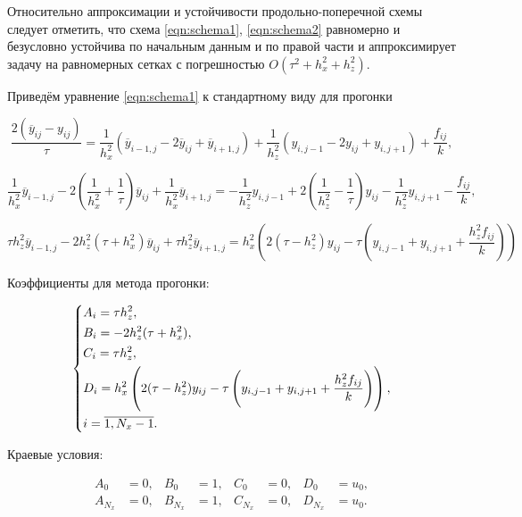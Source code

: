 \documentclass[12pt, a4paper]{article}
\begin{document}
Относительно аппроксимации и устойчивости продольно-поперечной схемы следует отметить, что схема \eqref{eqn:schema1}, \eqref{eqn:schema2} равномерно и безусловно устойчива по начальным данным и по правой части и аппроксимирует задачу на равномерных сетках с погрешностью $O(\tau^2 + h_x^2 + h_z^2)$.

Приведём уравнение \eqref{eqn:schema1} к стандартному виду для прогонки

\begin{equation}
	\frac{2(\overline y_{ij} - y_{ij})}{\tau} = \frac{1}{h_x^2} (\overline y_{i - 1, j} - 2\overline y_{ij} + \overline y_{i + 1, j}) + \frac{1}{h_z^2} (y_{i, j - 1} - 2y_{ij} + y_{i, j + 1}) + \frac{f_{ij}}k,
\end{equation}

\begin{equation}
	\frac{1}{h_x^2}\overline y_{i - 1, j} - 2 \left(\frac1{h_x^2} + \frac1\tau \right)\overline y_{ij} + \frac{1}{h_x^2}\overline y_{i + 1, j}
	= -\frac{1}{h_z^2}y_{i, j - 1} + 2\left(\frac1{h_z^2} - \frac1\tau\right)y_{ij} - \frac{1}{h_z^2}y_{i, j + 1} - \frac{f_{ij}}k,
\end{equation}

\begin{equation}
	\tau h_z^2 \overline y_{i - 1, j} - 2h_z^2(\tau + h_x^2)\overline y_{ij} + \tau h_z^2 \overline y_{i + 1, j}
	= h_x^2 \left( 2(\tau - h_z^2)y_{ij} - \tau \left( y_{i, j - 1} + y_{i, j + 1} + \frac{h_z^2 f_{ij}}k \right) \right)
\end{equation}

Коэффициенты для метода прогонки:

\begin{equation}
	\begin{dcases}
		A_i = \tau h_z^2, \\
		B_i = -2h_z^2(\tau + h_x^2), \\
		C_i = \tau h_z^2, \\
		D_i = h_x^2 \left( 2(\tau - h_z^2)y_{ij} - \tau \left( y_{i, j - 1} + y_{i, j + 1} + \frac{h_z^2 f_{ij}}k \right) \right), \\
		i = \overline{1, N_x - 1}. \\
	\end{dcases}
\end{equation}

Краевые условия:

\begin{equation}
	\begin{aligned}
		A_0     &= 0, & B_0     &= 1, & C_0     &= 0, & D_0     &= u_0, \\
		A_{N_x} &= 0, & B_{N_x} &= 1, & C_{N_x} &= 0, & D_{N_x} &= u_0. \\
	\end{aligned}
\end{equation}
\end{document}
